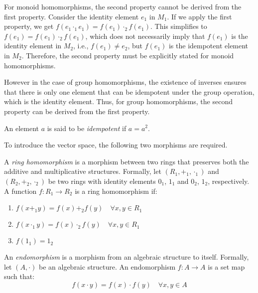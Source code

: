 \documentclass[
	11pt, %
	fleqn, %
	a4paper, %
]{LegrandOrangeBook}
\begin{document}
For monoid homomorphisms, the second property cannot be derived from the first property. Consider the identity element $e_1$ in $M_1$. If we apply the first property, we get $f(e_1 \cdot_1 e_1) = f(e_1) \cdot_2 f(e_1)$. This simplifies to $f(e_1) = f(e_1) \cdot_2 f(e_1)$, which does not necessarily imply that $f(e_1)$ is the identity element in $M_2$, i.e., $f(e_1) \neq e_2$, but $f(e_1)$ is the idempotent element in $M_2$. Therefore, the second property must be explicitly stated for monoid homomorphisms.

However in the case of group homomorphisms, the existence of inverses ensures that there is only one element that can be idempotent under the group operation, which is the identity element. Thus, for group homomorphisms, the second property can be derived from the first property.

\begin{definition}
    An element $a$ is said to be \emph{idempotent} if $a = a^2$.
\end{definition}

\newpage

To introduce the vector space, the following two morphisms are required.

\begin{definition}
    A \emph{ring homomorphism} is a morphism between two rings that preserves both the additive and multiplicative structures. Formally, let $(R_1, +_1, \cdot_1)$ and $(R_2, +_2, \cdot_2)$ be two rings with identity elements $0_1$, $1_1$ and $0_2$, $1_2$, respectively. A function $f: R_1 \to R_2$ is a ring homomorphism if:
    \begin{enumerate}
        \item $f(x +_1 y) = f(x) +_2 f(y) \quad \forall x, y \in R_1$
        \item $f(x \cdot_1 y) = f(x) \cdot_2 f(y) \quad \forall x, y \in R_1$
        \item $f(1_1) = 1_2$
    \end{enumerate}    
\end{definition}

\begin{definition}[Endomorphism]
    An \emph{endomorphism} is a morphism from an algebraic structure to itself. Formally, let $(A, \cdot)$ be an algebraic structure. An endomorphism $f: A \to A$ is a set map such that:
    \[
        f(x \cdot y) = f(x) \cdot f(y) \quad \forall x, y \in A
    \]
\end{definition}
\end{document}
